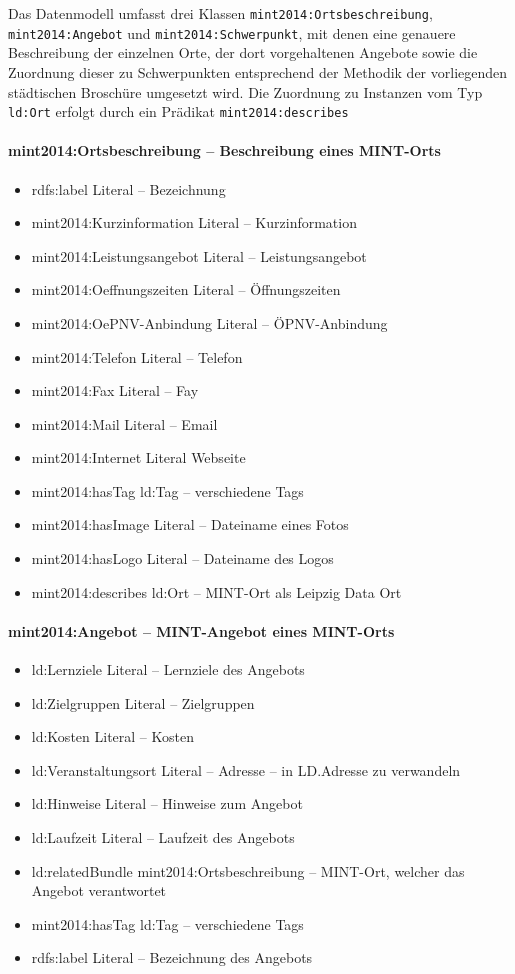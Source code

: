 \documentclass[a4paper,11pt]{article}
\begin{document}
Das Datenmodell umfasst drei Klassen \texttt{mint2014:Ortsbeschreibung},
\texttt{mint2014:Angebot} und \texttt{mint2014:Schwerpunkt}, mit denen eine
genauere Beschreibung der einzelnen Orte, der dort vorgehaltenen Angebote sowie
die Zuordnung dieser zu Schwerpunkten entsprechend der Methodik der
vorliegenden städtischen Broschüre umgesetzt wird.  Die Zuordnung zu Instanzen
vom Typ \texttt{ld:Ort} erfolgt durch ein Prädikat \texttt{mint2014:describes}

\paragraph{mint2014:Ortsbeschreibung – Beschreibung eines MINT-Orts}
\begin{itemize}\itemsep0pt
\item rdfs:label Literal – Bezeichnung
\item  mint2014:Kurzinformation Literal – Kurzinformation
\item  mint2014:Leistungsangebot Literal – Leistungsangebot
\item  mint2014:Oeffnungszeiten Literal – Öffnungszeiten
\item  mint2014:OePNV-Anbindung Literal – ÖPNV-Anbindung
\item  mint2014:Telefon Literal – Telefon
\item  mint2014:Fax Literal – Fay
\item  mint2014:Mail Literal – Email
\item  mint2014:Internet Literal  Webseite
\item  mint2014:hasTag ld:Tag – verschiedene Tags
\item  mint2014:hasImage Literal – Dateiname eines Fotos
\item  mint2014:hasLogo Literal – Dateiname des Logos
\item  mint2014:describes ld:Ort – MINT-Ort als Leipzig Data Ort
\end{itemize}
\paragraph{mint2014:Angebot – MINT-Angebot eines MINT-Orts}
\begin{itemize}\itemsep0pt
\item ld:Lernziele Literal – Lernziele des Angebots
\item ld:Zielgruppen Literal – Zielgruppen
\item ld:Kosten Literal – Kosten
\item ld:Veranstaltungsort Literal – Adresse – in LD.Adresse zu verwandeln
\item ld:Hinweise Literal – Hinweise zum Angebot
\item ld:Laufzeit Literal – Laufzeit des Angebots
\item ld:relatedBundle mint2014:Ortsbeschreibung – MINT-Ort, welcher das
  Angebot verantwortet
\item mint2014:hasTag ld:Tag – verschiedene Tags
\item rdfs:label Literal – Bezeichnung des Angebots
\end{itemize}
\end{document}

